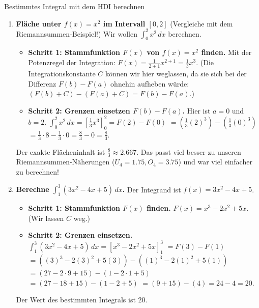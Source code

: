 \begin{beispielumgebung}{Bestimmtes Integral mit dem HDI berechnen}
\begin{enumerate}
    \item \textbf{Fläche unter $f(x)=x^2$ im Intervall $[0,2]$} (Vergleiche mit dem Riemannsummen-Beispiel!)
        Wir wollen $\int_{0}^{2} x^2 \,dx$ berechnen.
        \begin{itemize}
            \item \textbf{Schritt 1: Stammfunktion $F(x)$ von $f(x)=x^2$ finden.}
            Mit der Potenzregel der Integration: $F(x) = \frac{1}{2+1}x^{2+1} = \frac{1}{3}x^3$. (Die Integrationskonstante $C$ können wir hier weglassen, da sie sich bei der Differenz $F(b)-F(a)$ ohnehin aufheben würde: $(F(b)+C) - (F(a)+C) = F(b)-F(a)$.)
            \item \textbf{Schritt 2: Grenzen einsetzen $F(b)-F(a)$.}
            Hier ist $a=0$ und $b=2$.
            $\int_{0}^{2} x^2 \,dx = [ \frac{1}{3}x^3 ]_{0}^{2} = F(2) - F(0)$
            $= \left(\frac{1}{3}(2)^3\right) - \left(\frac{1}{3}(0)^3\right)$
            $= \frac{1}{3} \cdot 8 - \frac{1}{3} \cdot 0 = \frac{8}{3} - 0 = \frac{8}{3}$.
        \end{itemize}
        Der exakte Flächeninhalt ist $\frac{8}{3} \approx 2.667$. Das passt viel besser zu unseren Riemannsummen-Näherungen ($U_4=1.75, O_4=3.75$) und war viel einfacher zu berechnen!

    \item \textbf{Berechne $\int_{1}^{3} (3x^2 - 4x + 5) \,dx$.}
        Der Integrand ist $f(x) = 3x^2 - 4x + 5$.
        \begin{itemize}
            \item \textbf{Schritt 1: Stammfunktion $F(x)$ finden.}
            $F(x) = x^3 - 2x^2 + 5x$. (Wir lassen $C$ weg.)
            \item \textbf{Schritt 2: Grenzen einsetzen.}
            $\int_{1}^{3} (3x^2 - 4x + 5) \,dx = [x^3 - 2x^2 + 5x]_{1}^{3}$
            $= F(3) - F(1)$
            $= ((3)^3 - 2(3)^2 + 5(3)) - ((1)^3 - 2(1)^2 + 5(1))$
            $= (27 - 2 \cdot 9 + 15) - (1 - 2 \cdot 1 + 5)$
            $= (27 - 18 + 15) - (1 - 2 + 5)$
            $= (9 + 15) - (4) = 24 - 4 = 20$.
        \end{itemize}
        Der Wert des bestimmten Integrals ist 20.
\end{enumerate}
\end{beispielumgebung}

